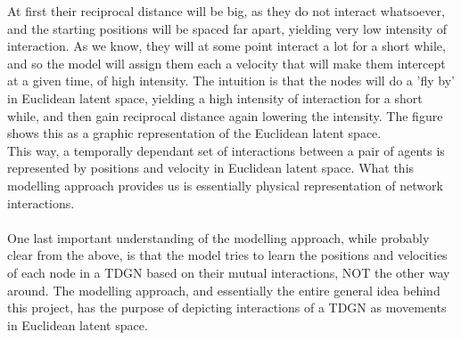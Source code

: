 At first their reciprocal distance will be big, as they do not interact whatsoever, and the starting positions will be spaced far apart, yielding very low intensity of interaction.
As we know, they will at some point interact a lot for a short while, and so the model will assign them each a velocity that will make them intercept at a given time, of high intensity. 
The intuition is that the nodes will do a 'fly by' in Euclidean latent space, yielding a high intensity of interaction for a short while, and then gain reciprocal distance again lowering the intensity.
The figure shows this as a graphic representation of the Euclidean latent space.
\\
This way, a temporally dependant set of interactions between a pair of agents is represented by positions and velocity in Euclidean latent space. 
What this modelling approach provides us is essentially physical representation of network interactions.
\\\\
One last important understanding of the modelling approach, while probably clear from the above, is that the model tries to learn the positions and velocities of each node in a TDGN based on their mutual interactions, NOT the other way around. 
The modelling approach, and essentially the entire general idea behind this project, has the purpose of depicting interactions of a TDGN as movements in Euclidean latent space.

